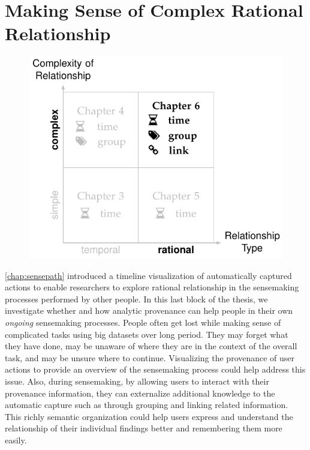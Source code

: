 \chapter{Making Sense of Complex Rational Relationship}
\label{chap:sensemap}

\graphicspath{{Chapter6/figures/}}

\begin{figure}[!htb]
	\centering
	\includegraphics{work}
\end{figure}

\vspace{.8in}


\pagebreak

\autoref{chap:sensepath} introduced a timeline visualization of automatically captured actions to enable researchers to explore rational relationship in the sensemaking processes performed by other people. In this last block of the thesis, we investigate whether and how analytic provenance can help people in their own \emph{ongoing} sensemaking processes. People often get lost while making sense of complicated tasks using big datasets over long period. They may forget what they have done, may be unaware of where they are in the context of the overall task, and may be unsure where to continue. Visualizing the provenance of user actions to provide an overview of the sensemaking process could help address this issue. Also, during sensemaking, by allowing users to interact with their provenance information, they can externalize additional knowledge to the automatic capture such as through grouping and linking related information. This richly semantic organization could help users express and understand the relationship of their individual findings better and remembering them more easily.

